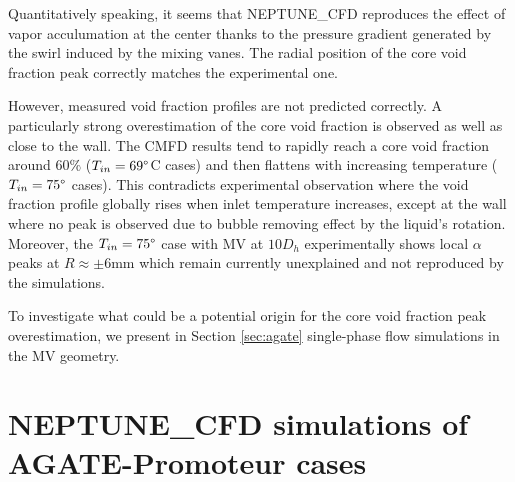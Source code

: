 \begin{figure}[!htb]
{}
\label{fig:debprom_ncfd}
\end{figure}
%


Quantitatively speaking, it seems that NEPTUNE\_CFD reproduces the effect of vapor acculumation at the center thanks to the pressure gradient generated by the swirl induced by the mixing vanes. The radial position  of the core void fraction peak correctly matches the experimental one. 

However, measured void fraction profiles are not predicted correctly. A particularly strong overestimation of the core void fraction is observed as well as close to the wall. The CMFD results tend to rapidly reach a core void fraction around $60\%$ ($T_{in}=69\degree$C cases) and then flattens with increasing temperature ($T_{in}=75\degree$ cases). This contradicts experimental observation where the void fraction profile globally rises when inlet temperature increases, except at the wall where no peak is observed due to bubble removing effect by the liquid's rotation. Moreover, the $T_{in}=75\degree$ case with MV at $10D_{h}$ experimentally shows local $\alpha$ peaks at $R\approx \pm 6$mm which remain currently unexplained and not reproduced by the simulations. 

To investigate what could be a potential origin for the core void fraction peak overestimation, we present in Section \ref{sec:agate} single-phase flow simulations in the MV geometry.





\section{NEPTUNE\_CFD simulations of AGATE-Promoteur cases}
\label{sec:agate_ncfd}



